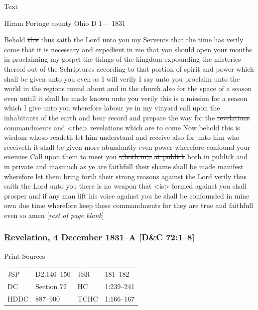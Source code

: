 {			\begin{description}
				\item[Text]
			\end{description}
			
				\begin{tightcenter}
				Hiram Portage county Ohio D 1--- 1831
				\end{tightcenter}
				
				Behold \sout{this} thus saith the Lord unto you my Servents that the time has verily come that it is necessary and expedient in me that you should open your mouths in proclaiming my gospel the things of the kingdom expounding the misteries thereof out of the Schriptures according to that portion of spirit and power which shall be given unto you even as I will verily I say unto you proclaim unto the world in the regions round about and in the church also for the space of a season even untill it shall be made known unto you verily this is a mission for a season which I give unto you wherefore labour ye in my vinyard call upon the inhabitants of the earth and bear record and prepare the way for the \sout{revelations} commandments and <the> revelations which are to come Now behold this is wisdom whoso readeth let him understand and receive also for unto him who receiveth it shall be given more abundantly even power wherefore confound your enemies Call upon them to meet you \sout{<both in>} \sout{at publick} both in publick and in private and inasmuch as ye are faithfull their shame shall be made manifest wherefore let them bring forth their strong reasons against the Lord verily thus saith the Lord unto you there is no weapon that <is> formed against you shall prosper and if any man lift his voice against you he shall be confounded in mine own due time wherefore keep these commandments for they are true and faithfull even so amen [\textit{rest of page blank}]
				
		\subsubsection{Revelation, 4 December 1831--A [D\&C 72:1--8]}
			\label{EMS-1831-JS-4-DEC-1831-A}
		
			\begin{description}
				\item[Print Sources]
			\end{description}

				\begin{tabular}{p{0.5in}p{1in}p{0.5in}p{1in}}
				JSP	 	& D2:146--150	& JSR 		& 181--182 \\
				DC	 	& Section 72 	& HC 		& 1:239--241 \\
				HDDC 	& 887--900		& TCHC 		& 1:166--167 \\
				\end{tabular}
			
}
